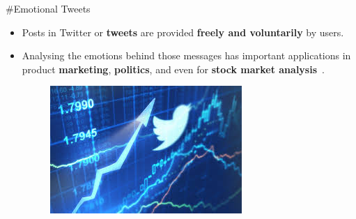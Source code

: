 \documentclass[handout]{beamer}
\begin{document}
\begin{frame}{\#Emotional Tweets}
\begin{scriptsize}
\begin{itemize}
 \item Posts in Twitter or \textbf{tweets} are provided \textbf{freely and voluntarily} by users.


 
 \item Analysing the emotions behind those messages has important applications in product \textbf{marketing}, \textbf{politics}, and even for \textbf{stock market analysis}~\cite{bollen2011twitter}.
 
   \begin{figure}[h]
        	\includegraphics[scale = 0.5]{pics/tweetStock.jpeg}
        \end{figure}
\end{itemize}
\end{scriptsize}




\end{frame}
\end{document}
